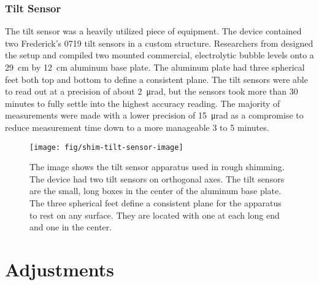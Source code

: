 \subsubsection{Tilt Sensor}
The tilt sensor was a heavily utilized piece of equipment.  The device contained two Frederick's 0719 tilt sensors in a custom structure.  Researchers from \uw designed the setup and compiled two mounted commercial, electrolytic bubble levels onto a \SI{29}{\cm} by \SI{12}{\cm} aluminum base plate. The aluminum plate had three spherical feet both top and bottom to define a consistent plane.  The tilt sensors were able to read out at a precision of about \SI{2}{\micro\radian}, but the sensors took more than 30 minutes to fully settle into the highest accuracy reading.  The majority of measurements were made with a lower precision of \SI{15}{\micro\radian} as a compromise to reduce measurement time down to a more manageable 3 to 5 minutes.

\begin{figure}
\centering
\texttt{[image: fig/shim-tilt-sensor-image]}
\caption{
    The image shows the tilt sensor apparatus used in rough shimming.  The device had two tilt sensors on orthogonal axes.  The tilt sensors are the small, long boxes in the center of the aluminum base plate.  The three spherical feet define a consistent plane for the apparatus to rest on any surface.  They are located with one at each long end and one in the center. 
    \label{fig:shim-tilt-sensor-image}
}
\end{figure}


\section{Adjustments}

